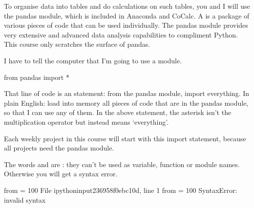 \documentclass[letterpaper,10pt,english]{sphinxmanual}
\begin{document}
To organise data into tables and do calculations on such tables, you and I will use the pandas module, which is included in Anaconda and CoCalc. A  is a package of various pieces of code that can be used individually. The pandas module provides very extensive and advanced data analysis capabilities to compliment Python. This course only scratches the surface of pandas.

I have to tell the computer that I’m going to use a module.


{
\begin{sphinxVerbatim}[commandchars=\\\{\}]
\llap{\color{nbsphinxin}[ ]:\,\hspace{\fboxrule}\hspace{\fboxsep}}
from pandas import *
\end{sphinxVerbatim}
}

That line of code is an  statement: from the pandas module, import everything. In plain English: load into memory all pieces of code that are in the pandas module, so that I can use any of them. In the above statement, the asterisk isn’t the multiplication operator but instead means ‘everything’.

Each weekly project in this course will start with this import statement, because all projects need the pandas module.

The words  and  are  : they can’t be used as variable, function or module names. Otherwise you will get a syntax error.


{
\begin{sphinxVerbatim}[commandchars=\\\{\}]
\llap{\color{nbsphinxin}[ ]:\,\hspace{\fboxrule}\hspace{\fboxsep}}
from = 100
File \PYGZdq{}\PYGZlt{}ipython\PYGZhy{}input\PYGZhy{}23\PYGZhy{}6958f0ebc10d\PYGZgt{}\PYGZdq{}, line 1
from = 100
\PYGZca{}
SyntaxError: invalid syntax
\end{sphinxVerbatim}
}
\end{document}
